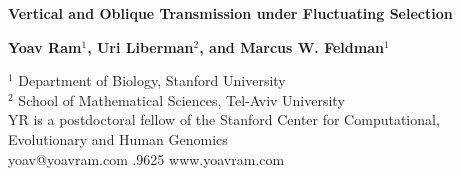\documentclass[a0,landscape]{a0poster}
\begin{document}


\begin{minipage}[b]{1\linewidth}

\center \veryHuge \color{NavyBlue} \textbf{Vertical and Oblique Transmission under Fluctuating Selection} \color{Black}\\ %

\vspace{1cm}

\huge \textbf{Yoav Ram$^{1}$, Uri Liberman$^{2}$, and Marcus W. Feldman$^1$}\\ %

\vspace{1cm}

\huge $^1$ Department of Biology, Stanford University\\ %
\huge $^{2}$ School of Mathematical Sciences, Tel-Aviv University\\ %


\Large YR is a postdoctoral fellow of the Stanford Center for Computational, Evolutionary and Human Genomics\\ 
\; yoav@yoavram.com \quad
{}.9625 \quad
{}\; www.yoavram.com

\end{minipage}
%
\end{document}
